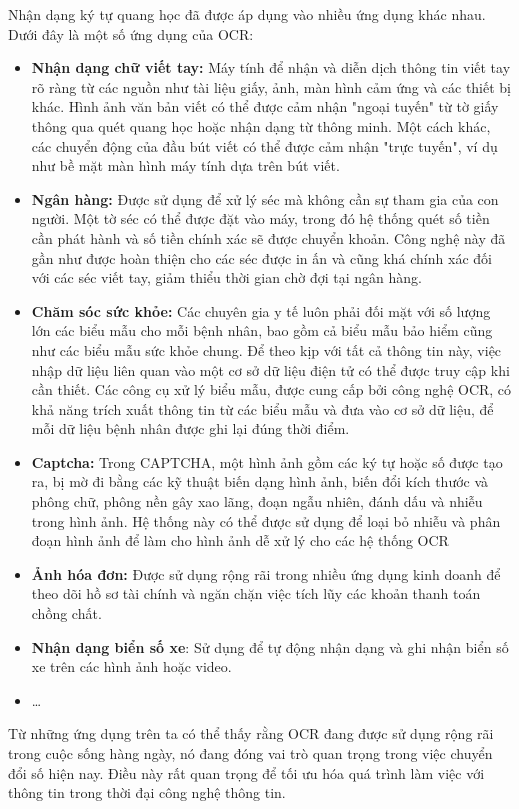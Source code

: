 Nhận dạng ký tự quang học đã được áp dụng vào nhiều ứng dụng khác nhau. Dưới đây là một  số ứng dụng của OCR: \cite{survey_ocr_Applications}
\begin{itemize}
    \item \textbf{Nhận dạng chữ viết tay:} Máy tính để nhận và diễn dịch thông tin viết tay rõ ràng từ các nguồn như tài liệu giấy, ảnh, màn hình cảm ứng và các thiết bị khác. Hình ảnh văn bản viết có thể được cảm nhận "ngoại tuyến" từ tờ giấy thông qua quét quang học hoặc nhận dạng từ thông minh. Một cách khác, các chuyển động của đầu bút viết có thể được cảm nhận "trực tuyến", ví dụ như bề mặt màn hình máy tính dựa trên bút viết.
    \item \textbf{Ngân hàng:} Được sử dụng để xử lý séc mà không cần sự tham gia của con người. Một tờ séc có thể được đặt vào máy, trong đó hệ thống quét số tiền cần phát hành và số tiền chính xác sẽ được chuyển khoản. Công nghệ này đã gần như được hoàn thiện cho các séc được in ấn và cũng khá chính xác đối với các séc viết tay, giảm thiểu thời gian chờ đợi tại ngân hàng.
    \item \textbf{Chăm sóc sức khỏe:} Các chuyên gia y tế luôn phải đối mặt với số lượng lớn các biểu mẫu cho mỗi bệnh nhân, bao gồm cả biểu mẫu bảo hiểm cũng như các biểu mẫu sức khỏe chung. Để theo kịp với tất cả thông tin này, việc nhập dữ liệu liên quan vào một cơ sở dữ liệu điện tử có thể được truy cập khi cần thiết. Các công cụ xử lý biểu mẫu, được cung cấp bởi công nghệ OCR, có khả năng trích xuất thông tin từ các biểu mẫu và đưa vào cơ sở dữ liệu, để mỗi dữ liệu bệnh nhân được ghi lại đúng thời điểm.
    \item \textbf{Captcha:} Trong CAPTCHA, một hình ảnh gồm các ký tự hoặc số được tạo ra, bị mờ đi bằng các kỹ thuật biến dạng hình ảnh, biến đổi kích thước và phông chữ, phông nền gây xao lãng, đoạn ngẫu nhiên, đánh dấu và nhiễu trong hình ảnh. Hệ thống này có thể được sử dụng để loại bỏ nhiễu và phân đoạn hình ảnh để làm cho hình ảnh dễ xử lý cho các hệ thống OCR
    \item \textbf{Ảnh hóa đơn:} Được sử dụng rộng rãi trong nhiều ứng dụng kinh doanh để theo dõi hồ sơ tài chính và ngăn chặn việc tích lũy các khoản thanh toán chồng chất.
    \item \textbf{Nhận dạng biển số xe}: Sử dụng để tự động nhận dạng và ghi nhận biển số xe trên các hình ảnh hoặc video.
    \item \ldots
\end{itemize}

Từ những ứng dụng trên ta có thể thấy rằng OCR đang được sử dụng rộng rãi trong cuộc sống hàng ngày, nó đang đóng vai trò quan trọng trong việc chuyển đổi số hiện nay. Điều này rất quan trọng để tối ưu hóa quá trình làm việc với thông tin trong thời đại công nghệ thông tin.

